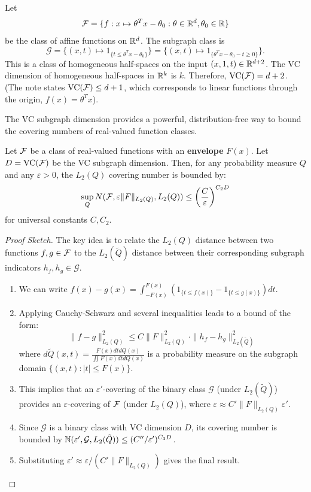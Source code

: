 \begin{eg}
Let 
\[
\mathcal{F} = \{ f: x \mapsto \theta^T x - \theta_0 : \theta \in \mathbb{R}^d, \theta_0 \in \mathbb{R} \}
\]
be the class of affine functions on $\mathbb{R}^d$. The subgraph class is 
\[
\mathcal{G} = \{ (x, t) \mapsto 1_{\{t \le \theta^T x - \theta_0\}} \} = \{ (x, t) \mapsto 1_{\{\theta^T x - \theta_0 - t \ge 0\}} \}.
\]
This is a class of homogeneous half-spaces on the input $(x, 1, t) \in \mathbb{R}^{d+2}$.
The VC dimension of homogeneous half-spaces in $\mathbb{R}^{k}$ is $k$. Therefore, $\text{VC}(\mathcal{F}) = d+2$.
(The note states $\text{VC}(\mathcal{F}) \le d+1$, which corresponds to linear functions through the origin, $f(x) = \theta^T x$).
\end{eg}

The VC subgraph dimension provides a powerful, distribution-free way to bound the covering numbers of real-valued function classes.

\begin{thm}
Let $\mathcal{F}$ be a class of real-valued functions with an \textbf{envelope} $F(x)$. Let $D = \text{VC}(\mathcal{F})$ be the VC subgraph dimension.
Then, for any probability measure $Q$ and any $\varepsilon > 0$, the $L_2(Q)$ covering number is bounded by:
$$
\sup_Q N(\mathcal{F},\varepsilon \|F\|_{L_2(Q)},  L_2(Q)) \le \left(\frac{C}{\varepsilon}\right)^{C_2 D}
$$
for universal constants $C, C_2$.
\end{thm}

\begin{proof}[Proof Sketch]
The key idea is to relate the $L_2(Q)$ distance between two functions $f, g \in \mathcal{F}$ to the $L_2(\tilde{Q})$ distance between their corresponding subgraph indicators $h_f, h_g \in \mathcal{G}$.
\begin{enumerate}
    \item We can write $f(x) - g(x) = \int_{-F(x)}^{F(x)} (1_{\{t \le f(x)\}} - 1_{\{t \le g(x)\}}) dt$.
    \item Applying Cauchy-Schwarz and several inequalities leads to a bound of the form:
    $$
    \|f - g\|_{L_2(Q)}^2 \le C \|F\|_{L_2(Q)}^2 \cdot \|h_f - h_g\|_{L_2(\tilde{Q})}^2
    $$
    where $d\tilde{Q}(x, t) = \frac{F(x) dt dQ(x)}{\iint F(x) dt dQ(x)}$ is a probability measure on the subgraph domain $\{(x,t) : |t| \le F(x)\}$.
    \item This implies that an $\varepsilon'$-covering of the binary class $\mathcal{G}$ (under $L_2(\tilde{Q})$) provides an $\varepsilon$-covering of $\mathcal{F}$ (under $L_2(Q)$), where $\varepsilon \approx C' \|F\|_{L_2(Q)} \varepsilon'$.
    \item Since $\mathcal{G}$ is a binary class with VC dimension $D$, its covering number is bounded by $\mathbb{N}(\varepsilon', \mathcal{G}, L_2(\tilde{Q})) \le (C'' / \varepsilon')^{C_3 D}$.
    \item Substituting $\varepsilon' \approx \varepsilon / (C' \|F\|_{L_2(Q)})$ gives the final result.
\end{enumerate}
\end{proof}

